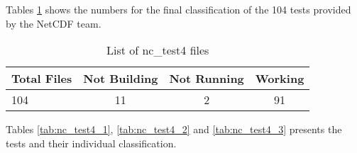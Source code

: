 Tables \ref{tab:nc_test4} shows the numbers for the final classification of the 104 tests provided by the NetCDF team.

\begin{table}[H]
\centering
\begin{tabular}{|l|c|c|c|}
\hline
\multicolumn{1}{|c|}{Total Files} & \multicolumn{1}{c|}{Not Building} & \multicolumn{1}{c|}{Not Running} & \multicolumn{1}{c|}{Working} \\ \hline \hline
104         &    11       &     2      &    91   \\ \hline \hline
\end{tabular}
\caption{\label{tab:nc_test4} List of nc\_test4 files}
\end{table}

Tables \ref{tab:nc_test4_1}, \ref{tab:nc_test4_2} and \ref{tab:nc_test4_3} presents the tests and their individual classification.

\clearpage

